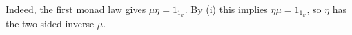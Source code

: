 Indeed, the first monad law gives $\mu\eta = 1_{1_{\mathcal{C}}}$. By (i) this
implies $\eta\mu = 1_{1_{\mathcal{C}}}$, so $\eta$ has the two-sided inverse
$\mu$.
